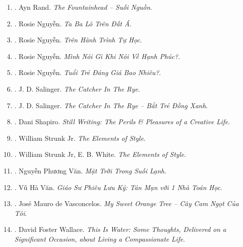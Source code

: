 \documentclass{article}
\begin{document}
\begin{enumerate}
	\item \cite{Rand_fountainhead}. Ayn Rand. {\it The Fountainhead -- Suối Nguồn}.\hfill{\sf[done]}
	
	\item \cite{Rosie_travel}. Rosie Nguyễn. {\it Ta Ba Lô Trên Đất Á}.\hfill{\sf[done]}
	
	\item \cite{Rosie_self_study}. Rosie Nguyễn. {\it Trên Hành Trình Tự Học}.\hfill{\sf[done]}
	
	\item \cite{Rosie_happy}. Rosie Nguyễn. {\it Mình Nói Gì Khi Nói Về Hạnh Phúc?}.\hfill{\sf[done]}
	
	\item \cite{Rosie_youth}. Rosie Nguyễn. {\it Tuổi Trẻ Đáng Giá Bao Nhiêu?}.\hfill{\sf[done]}
	
	\item \cite{Salinger_catcher_in_rye}. {\sc J. D. Salinger}. {\it The Catcher In The Rye}.
	
	\item \cite{Salinger_btdx}. {\sc J. D. Salinger}. {\it The Catcher In The Rye -- Bắt Trẻ Đồng Xanh}.\hfill{\sf[done]}
	
	\item \cite{Shapiro2014}. Dani Shapiro. {\it Still Writing: The Perils \& Pleasures of a Creative Life}.\hfill{\sf[reading]}
	
	\item \cite{Strunk_element_style}. William Strunk Jr. {\it The Elements of Style}.\hfill{\sf[done]}
	
	\item \cite{Strunk_White_element_style}. William Strunk Jr, E. B. White. {\it The Elements of Style}.\hfill{\sf[done]}
	
	\item \cite{Van_mat_troi_suoi_lanh}. Nguyễn Phương Văn. {\it Mặt Trời Trong Suối Lạnh}.\hfill{\sf[done]}
	
	\item \cite{VanVu2022}. Vũ Hà Văn. {\it Giáo Sư Phiêu Lưu Ký: Tản Mạn với 1 Nhà Toán Học}.\hfill{\sf[done]}
	
	\item \cite{Vasconcelos_orange_tree}. Jos\'e Mauro de Vasconcelos. {\it My Sweet Orange Tree -- Cây Cam Ngọt Của Tôi}.\hfill{\sf[done]}
	
	\item \cite{Wallace_water}. David Foster Wallace. {\it This Is Water: Some Thoughts, Delivered on a Significant Occasion, about Living a Compassionate Life}.\hfill{\sf[done]}
	

\end{enumerate}
\end{document}
